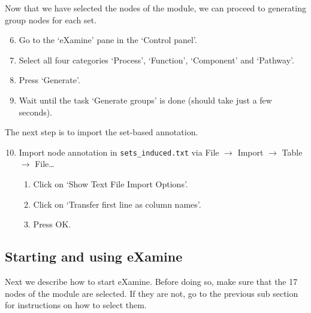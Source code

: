 \documentclass[a4paper,11pt]{article}
\begin{document}
Now that we have selected the nodes of the module, we can proceed to generating
group nodes for each set.

\begin{enumerate}
  \setcounter{enumi}{5}
  \item Go to the `eXamine' pane in the `Control panel'.
  \item Select all four categories `Process', `Function', `Component' and `Pathway'.
  \item Press `Generate'.
  \item Wait until the task `Generate groups' is done (should take just a few
    seconds).
\end{enumerate}

The next step is to import the set-based annotation.

\begin{enumerate}
  \setcounter{enumi}{9}
  \item Import node annotation in \texttt{sets\_induced.txt} via File
    $\rightarrow$ Import $\rightarrow$ Table $\rightarrow$ File\ldots
    \begin{enumerate}
      \item Click on `Show Text File Import Options'.
      \item Click on `Transfer first line as column names'.
      \item Press OK.
    \end{enumerate}
\end{enumerate}

\subsection{Starting and using eXamine}

Next we describe how to start eXamine. Before doing so, make sure that the 17
nodes of the module are selected. If they are not, go to the previous sub
section for instructions on how to select them.
\end{document}
